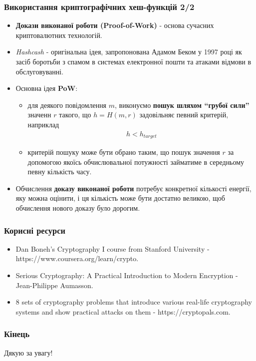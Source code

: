\documentclass{beamer}
\begin{document}
\begin{frame}
  \frametitle{Використання криптографічних хеш-функцій 2/2}
  \begin{itemize}
  \item \textbf{Докази виконаної роботи (Proof-of-Work)} - основа сучасних
    криптовалютних технологій.
  \item \textit{Hashcash} - оригінальна ідея, запропонована Адамом Беком у 1997
    році як засіб боротьби з спамом в системах електронної пошти та атаками
    відмови в обслуговуванні.
  \item Основна ідея \textbf{PoW}:
    \begin{itemize}
    \item для деякого повідомлення $m$, виконуємо \textbf{пошук шляхом ``грубої
        сили''} значенн $r$ такого, що $h = H(m, r)$ задовільняє певний
      критерій, наприклад 
      \begin{align*}
        h < h_{target}
      \end{align*}
    \item критерій пошуку може бути обрано таким, що пошук значення $r$ за
      допомогою якоїсь обчислювальної потужності займатиме в середньому певну
      кількість часу.
    \end{itemize}
  \item Обчислення \textbf{доказу виконаної роботи} потребує конкретної
    кількості енергії, яку можна оцінити, і ця кількість може бути достатно
    великою, щоб обчислення нового доказу було дорогим.
  \end{itemize}
\end{frame}

\begin{frame}
  \frametitle{Корисні ресурси}
  \begin{itemize}
  \item Dan Boneh's Cryptography I course from Stanford University -
    https://www.coursera.org/learn/crypto.
  \item Serious Cryptography: A Practical Introduction to Modern Encryption -
    Jean-Philippe Aumasson.
  \item 8 sets of cryptography problems that introduce various real-life
    cryptography systems and show practical attacks on them -
    https://cryptopals.com.
  \end{itemize}
\end{frame}

\begin{frame}
  \frametitle{Кінець}
  \begin{center}
    Дякую за увагу!
  \end{center}
\end{frame}
\end{document}
